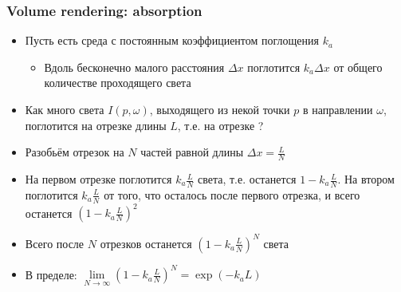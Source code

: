 \documentclass[10pt]{beamer}
\begin{document}
\begin{frame}[fragile]
\frametitle{Volume rendering: absorption}
\begin{itemize}
\item Пусть есть среда с постоянным коэффициентом поглощения \begin{math}k_a\end{math}
\pause
\begin{itemize}
\item Вдоль бесконечно малого расстояния \begin{math}\Delta x\end{math} поглотится \begin{math}k_a \Delta x\end{math} от общего количестве проходящего света
\end{itemize}
\pause
\item Как много света \begin{math}I(p,\omega)\end{math}, выходящего из некой точки \begin{math}p\end{math} в направлении \begin{math}\omega\end{math}, поглотится на отрезке длины \begin{math}L\end{math}, т.е. на отрезке \begin{math}[p, p + L\omega]\end{math}?
\pause
\item Разобьём отрезок на \begin{math}N\end{math} частей равной длины \begin{math}\Delta x = \frac{L}{N}\end{math}
\pause
\item На первом отрезке поглотится \begin{math}k_a \frac{L}{N}\end{math} света, т.е. останется \begin{math}1 - k_a\frac{L}{N}\end{math}. На втором поглотится \begin{math}k_a \frac{L}{N}\end{math} от того, что осталось после первого отрезка, и всего останется \begin{math}\left(1 - k_a\frac{L}{N}\right)^2\end{math}
\pause
\item Всего после \begin{math}N\end{math} отрезков останется \begin{math}\left(1 - k_a\frac{L}{N}\right)^N\end{math} света
\pause
\item В пределе: \begin{math}\lim\limits_{N \rightarrow \infty} \left(1 - k_a\frac{L}{N}\right)^N = \exp(- k_a L)\end{math}
\end{itemize}
\end{frame}
\end{document}
